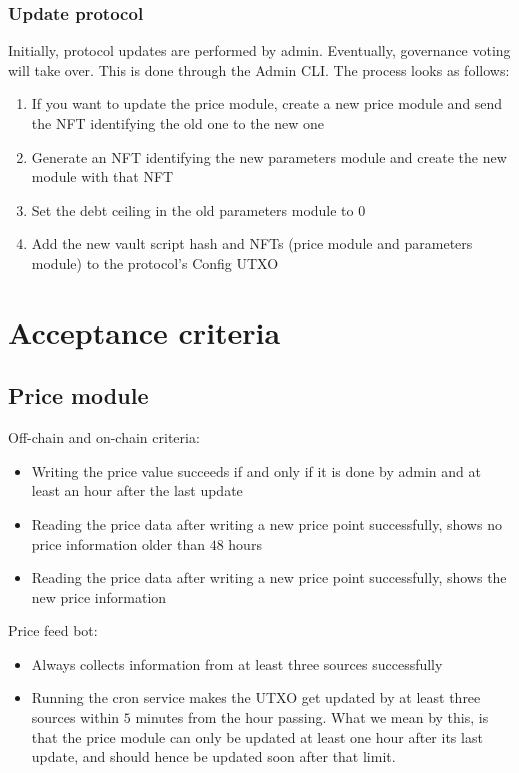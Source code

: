 \documentclass{article} %
\begin{document}
\subsubsection*{Update protocol}

Initially, protocol updates are performed by admin. Eventually, governance
voting will take over. This is done through the Admin CLI. The process looks as
follows:
\begin{enumerate}
  \item If you want to update the price module, create a new price module and
    send the NFT identifying the old one to the new one
  \item Generate an NFT identifying the new parameters module and create the new
    module with that NFT
  \item Set the debt ceiling in the old parameters module to $0$
  \item Add the new vault script hash and NFTs (price module and parameters
    module) to the protocol's Config UTXO
\end{enumerate}

\section{Acceptance criteria}

\subsection{Price module}

Off-chain and on-chain criteria:
\begin{itemize}
  \item Writing the price value succeeds if and only if it is done by admin and
    at least an hour after the last update
  \item Reading the price data after writing a new price point successfully,
    shows no price information older than $48$ hours
  \item Reading the price data after writing a new price point successfully,
    shows the new price information
\end{itemize}

Price feed bot:
\begin{itemize}
  \item Always collects information from at least three sources successfully
  \item Running the cron service makes the UTXO get updated by at least three
    sources within $5$ minutes from the hour passing. What we mean by this, is
    that the price module can only be updated at least one hour after its last
    update, and should hence be updated soon after that limit.
\end{itemize}
\end{document}
